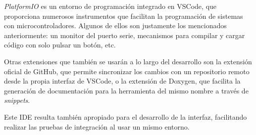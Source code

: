 \textit{PlatformIO} es un entorno de programación integrado en VSCode, que proporciona numerosos instrumentos que facilitan la programación de sistemas con microcontroladores. Algunos de ellos son justamente los mencionados anteriormente: un monitor del puerto serie, mecanismos para compilar y cargar código con solo pulsar un botón, etc.

Otras extensiones que también se usarán a lo largo del desarrollo son la extensión oficial de GitHub, que permite sincronizar los cambios con un repositorio remoto desde la propia interfaz de VSCode, o la extensión de Doxygen, que facilita la generación de documentación para la herramienta del mismo nombre a través de \textit{snippets}.

Este IDE resulta también apropiado para el desarrollo de la interfaz, facilitando realizar las pruebas de integración al usar un mismo entorno.
